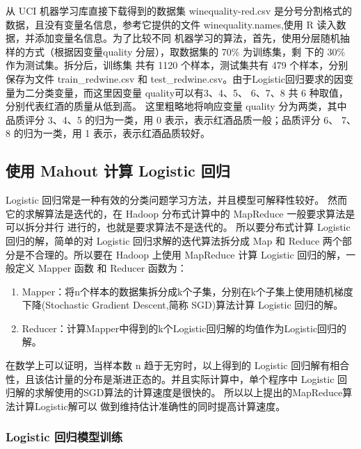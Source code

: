 从 UCI 机器学习库直接下载得到的数据集 winequality-red.csv
是分号分割格式的数据，且没有变量名信息，参考它提供的文件
winequality.names,使用 R 读入数据，并添加变量名信息。为了比较不同
机器学习的算法，首先，使用分层随机抽样的方式（根据因变量quality
分层），取数据集的 70\% 为训练集，剩 下的 30\% 作为测试集。拆分后，训练集
共有 1120 个样本，测试集共有 479 个样本，分别保存为文件 train\_redwine.csv
和 test\_redwine.csv。由于Logistic回归要求的因变量为二分类变量，而这里因变量
quality可以有3、4、5、 6、7、8 共 6 种取值，分别代表红酒的质量从低到高。
这里粗略地将响应变量 quality 分为两类，其中品质评分 3、4、5
的归为一类，用 0 表示，表示红酒品质一般；品质评分 6、 7、8 的归为一类，用 1
表示，表示红酒品质较好。

\subsection{使用 Mahout 计算 Logistic
回归}\label{ux4f7fux7528-mahout-ux8ba1ux7b97-logistic-ux56deux5f52}

Logistic 回归常是一种有效的分类问题学习方法，并且模型可解释性较好。
然而它的求解算法是迭代的，在 Hadoop 分布式计算中的 MapReduce
一般要求算法是可以拆分并行 进行的，也就是要求算法不是迭代的。
所以要分布式计算 Logistic 回归的解，简单的对 Logistic
回归求解的迭代算法拆分成 Map 和 Reduce 两个部分是不合理的。所以要在
Hadoop 上使用 MapReduce 计算 Logistic 回归的解，一般定义 Mapper 函数 和
Reducer 函数为：

\begin{enumerate}
\def\labelenumi{\arabic{enumi}.}
\item
  Mapper：将n个样本的数据集拆分成k个子集，分别在k个子集上使用随机梯度下降(Stochastic
  Gradient Descent,简称 SGD)算法计算 Logistic 回归的解。
\item
  Reducer：计算Mapper中得到的k个Logistic回归解的均值作为Logistic回归的解。
\end{enumerate}

在数学上可以证明，当样本数 n 趋于无穷时，以上得到的 Logistic
回归解有相合性，且该估计量的分布是渐进正态的。并且实际计算中，单个程序中
Logistic 回归解的求解使用的SGD算法的计算速度是很快的。
所以以上提出的MapReduce算法计算Logistic解可以
做到维持估计准确性的同时提高计算速度。

\subsubsection{Logistic
回归模型训练}\label{logistic-ux56deux5f52ux6a21ux578bux8badux7ec3}

